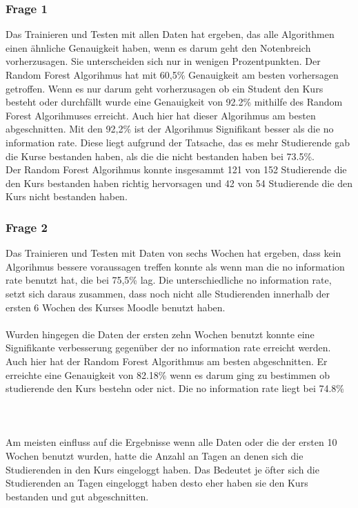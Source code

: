 \subsubsection{Frage 1}
Das Trainieren und Testen mit allen Daten hat ergeben, das alle Algorithmen einen ähnliche Genauigkeit haben, wenn es darum geht den Notenbreich vorherzusagen.
Sie unterscheiden sich nur in wenigen Prozentpunkten. Der Random Forest Algorihmus hat mit 60,5\% Genauigkeit am besten vorhersagen getroffen.
Wenn es nur darum geht vorherzusagen ob ein Student den Kurs besteht oder durchfällt wurde eine Genauigkeit von 92.2\% mithilfe des Random Forest Algorihmuses erreicht. 
Auch hier hat dieser Algorihmus am besten abgeschnitten. Mit den 92,2\% ist der Algorihmus Signifikant besser als die \glqq no information rate\grqq{}. 
Diese liegt aufgrund der Tatsache, das es mehr Studierende gab die Kurse bestanden haben, als die die nicht bestanden haben bei 73.5\%. 
\\ \noindent
Der Random Forest Algorihmus konnte insgesammt 121 von 152 Studierende die den Kurs bestanden haben richtig hervorsagen und 42 von 54 Studierende die den Kurs nicht bestanden haben.

\subsubsection{Frage 2}
Das Trainieren und Testen mit Daten von sechs Wochen hat ergeben, dass kein Algorihmus bessere voraussagen treffen konnte als wenn man die \glqq no information rate\grqq{} benutzt hat,
die bei 75,5\% lag. Die unterschiedliche \glqq no information rate\grqq{}, setzt sich daraus zusammen, dass noch nicht alle Studierenden innerhalb der ersten 6 Wochen des Kurses Moodle benutzt haben.
\\ \noindent \\ \noindent
Wurden hingegen die Daten der ersten zehn Wochen benutzt konnte eine Signifikante verbesserung gegenüber der \glqq no information rate\grqq{} erreicht werden. 
Auch hier hat der Random Forest Algorithmus am besten abgeschnitten. Er erreichte eine Genauigkeit von 82.18\% wenn es darum ging zu bestimmen ob studierende den Kurs bestehn oder nict.
Die \glqq no information rate\grqq{} liegt bei 74.8\%
\\ \noindent \\ \noindent
\\ \noindent \\ \noindent
Am meisten einfluss auf die Ergebnisse wenn alle Daten oder die der ersten 10 Wochen benutzt wurden, hatte die Anzahl an Tagen an denen sich die Studierenden in den Kurs eingeloggt haben.
Das Bedeutet je öfter sich die Studierenden an Tagen eingeloggt haben desto eher haben sie den Kurs bestanden und gut abgeschnitten.

